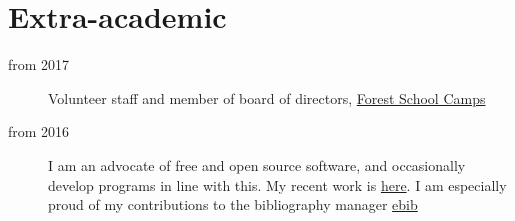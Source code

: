 \documentclass{cv}
\begin{document}
\section*{Extra-academic}
\begin{description}
\item[{from 2017}] Volunteer staff and member of board of directors,
\href{https://www.fsc.org.uk/}{Forest School Camps}
\item[{from 2016}] I am an advocate of free and open source software, and
occasionally develop programs in line with this. My recent work is
\href{https://github.com/Hugo-Heagren}{here}. I am especially proud of my contributions to the bibliography
manager \href{https://joostkremers.github.io/ebib/}{ebib}
\end{description}
\end{document}
